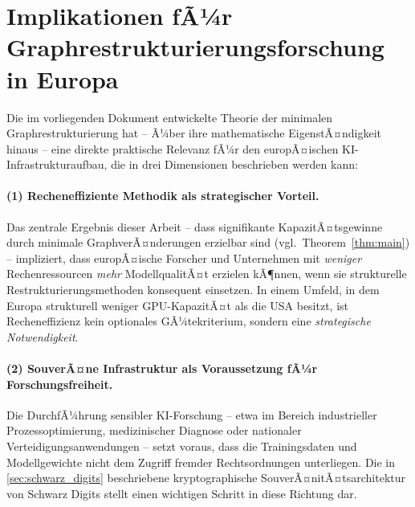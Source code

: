 ﻿\documentclass[12pt, a4paper, openany]{report}
\begin{document}
\section{Implikationen fÃ¼r Graphrestrukturierungsforschung in Europa}
\label{sec:implikationen_graphresearch}

Die im vorliegenden Dokument entwickelte Theorie der minimalen
Graphrestrukturierung hat -- Ã¼ber ihre mathematische EigenstÃ¤ndigkeit
hinaus -- eine direkte praktische Relevanz fÃ¼r den europÃ¤ischen
KI-Infrastrukturaufbau, die in drei Dimensionen beschrieben werden kann:

\paragraph{(1) Recheneffiziente Methodik als strategischer Vorteil.}
Das zentrale Ergebnis dieser Arbeit -- dass signifikante KapazitÃ¤tsgewinne
durch minimale GraphverÃ¤nderungen erzielbar sind (vgl.\
Theorem~\ref{thm:main}) -- impliziert, dass europÃ¤ische Forscher und
Unternehmen mit \emph{weniger} Rechenressourcen \emph{mehr} ModellqualitÃ¤t
erzielen kÃ¶nnen, wenn sie strukturelle Restrukturierungsmethoden konsequent
einsetzen. In einem Umfeld, in dem Europa strukturell weniger
GPU-KapazitÃ¤t als die USA besitzt, ist Recheneffizienz kein optionales
GÃ¼tekriterium, sondern eine \emph{strategische Notwendigkeit}.

\paragraph{(2) SouverÃ¤ne Infrastruktur als Voraussetzung fÃ¼r Forschungsfreiheit.}
Die DurchfÃ¼hrung sensibler KI-Forschung -- etwa im Bereich industrieller
Prozessoptimierung, medizinischer Diagnose oder nationaler
Verteidigungsanwendungen -- setzt voraus, dass die Trainingsdaten und
Modellgewichte nicht dem Zugriff fremder Rechtsordnungen unterliegen.
Die in \cref{sec:schwarz_digits} beschriebene kryptographische
SouverÃ¤nitÃ¤tsarchitektur von Schwarz Digits stellt einen wichtigen
Schritt in diese Richtung dar.
\end{document}
